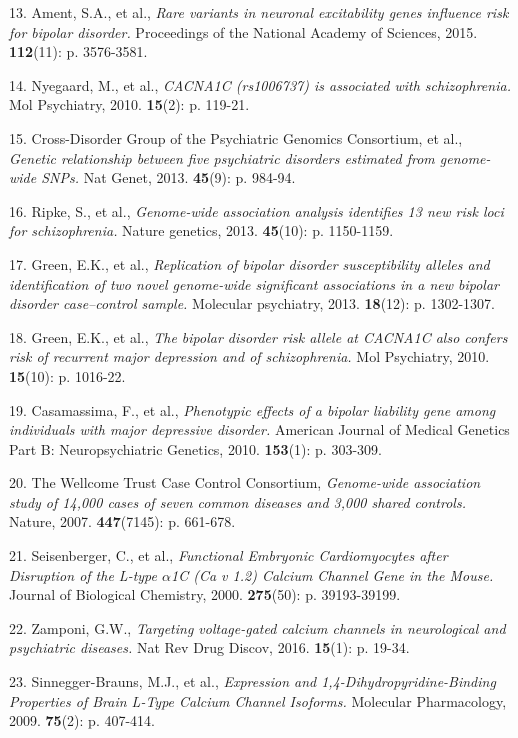 \documentclass[]{article}
\begin{document}
13. Ament, S.A., et al., \emph{Rare variants in neuronal excitability
genes influence risk for bipolar disorder.} Proceedings of the National
Academy of Sciences, 2015. \textbf{112}(11): p. 3576-3581.

14. Nyegaard, M., et al., \emph{CACNA1C (rs1006737) is associated with
schizophrenia.} Mol Psychiatry, 2010. \textbf{15}(2): p. 119-21.

15. Cross-Disorder Group of the Psychiatric Genomics Consortium, et al.,
\emph{Genetic relationship between five psychiatric disorders estimated
from genome-wide SNPs.} Nat Genet, 2013. \textbf{45}(9): p. 984-94.

16. Ripke, S., et al., \emph{Genome-wide association analysis identifies
13 new risk loci for schizophrenia.} Nature genetics, 2013.
\textbf{45}(10): p. 1150-1159.

17. Green, E.K., et al., \emph{Replication of bipolar disorder
susceptibility alleles and identification of two novel genome-wide
significant associations in a new bipolar disorder case--control
sample.} Molecular psychiatry, 2013. \textbf{18}(12): p. 1302-1307.

18. Green, E.K., et al., \emph{The bipolar disorder risk allele at
CACNA1C also confers risk of recurrent major depression and of
schizophrenia.} Mol Psychiatry, 2010. \textbf{15}(10): p. 1016-22.

19. Casamassima, F., et al., \emph{Phenotypic effects of a bipolar
liability gene among individuals with major depressive disorder.}
American Journal of Medical Genetics Part B: Neuropsychiatric Genetics,
2010. \textbf{153}(1): p. 303-309.

20. The Wellcome Trust Case Control Consortium, \emph{Genome-wide
association study of 14,000 cases of seven common diseases and 3,000
shared controls.} Nature, 2007. \textbf{447}(7145): p. 661-678.

21. Seisenberger, C., et al., \emph{Functional Embryonic Cardiomyocytes
after Disruption of the L-type $\alpha$1C (Ca v 1.2) Calcium Channel Gene in
the Mouse.} Journal of Biological Chemistry, 2000. \textbf{275}(50): p.
39193-39199.

22. Zamponi, G.W., \emph{Targeting voltage-gated calcium channels in
neurological and psychiatric diseases.} Nat Rev Drug Discov, 2016.
\textbf{15}(1): p. 19-34.

23. Sinnegger-Brauns, M.J., et al., \emph{Expression and
1,4-Dihydropyridine-Binding Properties of Brain L-Type Calcium Channel
Isoforms.} Molecular Pharmacology, 2009. \textbf{75}(2): p. 407-414.
\end{document}
